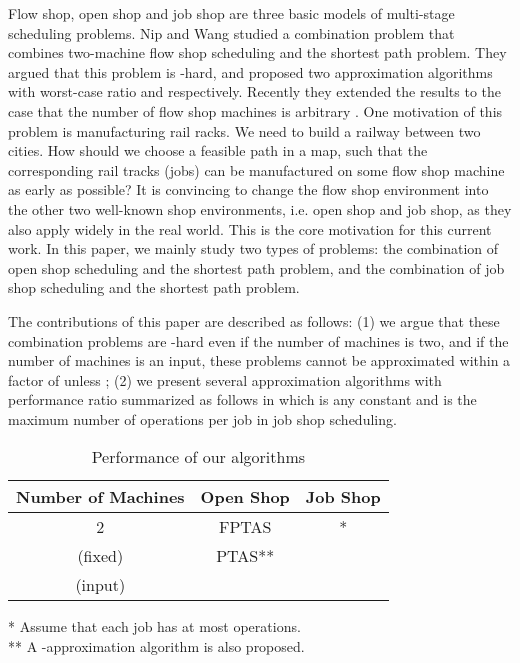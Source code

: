 \documentclass{llncs}
\numberwithin{subcase}{case}
\begin{document}
Flow shop, open shop and job shop are three basic models of multi-stage scheduling problems. Nip and Wang \cite{NW13} studied a combination problem that combines two-machine flow shop scheduling and the shortest path problem. They argued that this problem is -hard, and proposed two approximation algorithms with worst-case ratio  and  respectively. Recently they extended the results to the case that the number of flow shop machines is arbitrary \cite{NW13_2}. One motivation of this problem is manufacturing rail racks. We need to build a railway between two cities. How should we choose a feasible path in a map, such that the corresponding rail tracks (jobs) can be manufactured on some flow shop machine as early as possible? It is convincing to change the flow shop environment into the other two well-known shop environments, i.e. open shop and job shop, as they also apply widely in the real world. This is the core motivation for this current work. In this paper, we mainly study two types of problems: the combination of open shop scheduling and the shortest path problem, and the combination of job shop scheduling and the shortest path problem.

The contributions of this paper are described as follows:
(1) we argue that these combination problems are -hard even if the number of machines is two, and if the number of machines is an input, these problems cannot be approximated within a factor of  unless ; (2) we present several approximation algorithms with performance ratio summarized as follows in which  is any constant and  is the maximum number of operations per job in job shop scheduling.
\begin{table}[h]\label{tab1}
\begin{center}
\begin{tabular}{|c|c|c|}
                  \hline
Number of Machines & Open Shop & Job Shop\\
                  \hline
                  2 & FPTAS & * \\
                   (fixed) & PTAS** & \\
                   (input) &   &  \\
                  \hline
\end{tabular}
\caption{Performance of our algorithms}
\end{center}
* Assume that each job has at most  operations.\\
** A -approximation algorithm is also proposed.
\end{table}
\end{document}

